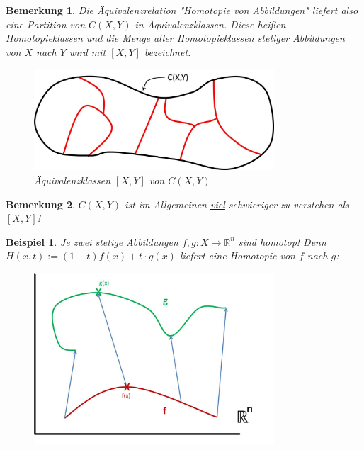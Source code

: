 \documentclass[a4paper,11pt,notitlepage]{report}
\newtheorem{remark}{Bemerkung}[chapter]
\newtheorem{example}{Beispiel}[chapter]
\newcommand{\R}{{\ensuremath{\mathbb{R}}}}
\begin{document}
\begin{remark}
Die Äquivalenzrelation "Homotopie von Abbildungen" liefert also eine Partition von $C(X,Y)$ in Äquivalenzklassen. Diese heißen Homotopieklassen und die \underline{Menge aller Homotopieklassen} \underline{stetiger Abbildungen} \underline{von $X$ nach $Y$} wird mit $[X,Y]$ bezeichnet.
\begin{figure}[h]
\centering
\includegraphics[width=0.8\textwidth]{images/Aequivalenzklassen.jpg}
\caption{Äquivalenzklassen $[X,Y]$ von $C(X,Y)$}
\end{figure}
\end{remark}

\begin{remark}
$C(X,Y)$ ist im Allgemeinen \underline{\underline{viel}} schwieriger zu verstehen als $[X,Y]$!
\end{remark}

\begin{example}
Je zwei stetige Abbildungen $f,g \colon X \rightarrow \R^n$ sind homotop! Denn $H(x,t):= (1-t) f(x) + t \cdot g(x)$ liefert eine Homotopie von $f$ nach $g$:
\begin{figure}[h]
\centering
\includegraphics[width=0.8\textwidth]{images/R_n_immer_homotop.jpg}
\end{figure} 
\end{example}
\end{document}
